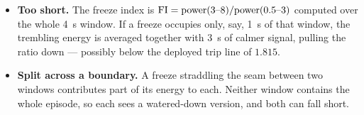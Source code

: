 \begin{itemize}
  \item \textbf{Too short.} The freeze index is $\mathrm{FI} = \text{power}(3\text{--}8)/
        \text{power}(0.5\text{--}3)$ computed over the whole \SI{4}{s} window. If a
        freeze occupies only, say, \SI{1}{s} of that window, the trembling energy is
        averaged together with \SI{3}{s} of calmer signal, pulling the ratio down ---
        possibly below the deployed trip line of $1.815$.
  \item \textbf{Split across a boundary.} A freeze straddling the seam between two
        windows contributes part of its energy to each. Neither window contains the
        whole episode, so each sees a watered-down version, and both can fall short.
\end{itemize}

